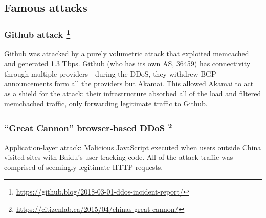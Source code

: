 \documentclass[11pt,oneside,a4paper]{article}
\begin{document}
\subsection{Famous attacks}

\subsubsection[Github attack]{Github attack \footnote{\href{https://github.blog/2018-03-01-ddos-incident-report/}{https://github.blog/2018-03-01-ddos-incident-report/}}}

Github was attacked by a purely volumetric attack that exploited memcached and generated 1.3 Tbps. Github (who has its own AS, 36459) has connectivity through multiple providers - during the DDoS, they withdrew BGP announcements form all the providers but Akamai. This allowed Akamai to act as a shield for the attack: their infrastructure absorbed all of the load and filtered memchached traffic, only forwarding legitimate traffic to Github.

\subsubsection[“Great Cannon” browser-based DDoS]{“Great Cannon” browser-based DDoS \footnote{\href{https://citizenlab.ca/2015/04/chinas-great-cannon/}{https://citizenlab.ca/2015/04/chinas-great-cannon/}}}

Application-layer attack: Malicious JavaScript executed when users outside China visited sites
with Baidu’s user tracking code. All of the attack traffic was comprised of seemingly legitimate HTTP requests.


\label{lastpage} %
\clearpage
{}



\clearpage
\appendix
{}
\end{document}
